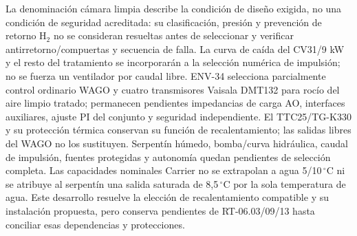 La denominación cámara limpia describe la condición de diseño exigida, no una condición de seguridad acreditada: su clasificación, presión y prevención de retorno H$_2$ no se consideran resueltas antes de seleccionar y verificar antirretorno/compuertas y secuencia de falla. La curva de caída del CV31/9 kW y el resto del tratamiento se incorporarán a la selección numérica de impulsión; no se fuerza un ventilador por caudal libre. ENV-34 selecciona parcialmente control ordinario WAGO y cuatro transmisores Vaisala DMT132 para rocío del aire limpio tratado; permanecen pendientes impedancias de carga AO, interfaces auxiliares, ajuste PI del conjunto y seguridad independiente. El TTC25/TG-K330 y su protección térmica conservan su función de recalentamiento; las salidas libres del WAGO no los sustituyen. Serpentín húmedo, bomba/curva hidráulica, caudal de impulsión, fuentes protegidas y autonomía quedan pendientes de selección completa. Las capacidades nominales Carrier no se extrapolan a agua 5/10\,$^{\circ}$C ni se atribuye al serpentín una salida saturada de 8,5\,$^{\circ}$C por la sola temperatura de agua. Este desarrollo resuelve la elección de recalentamiento compatible y su instalación propuesta, pero conserva pendientes de RT-06.03/09/13 hasta conciliar esas dependencias y protecciones.
